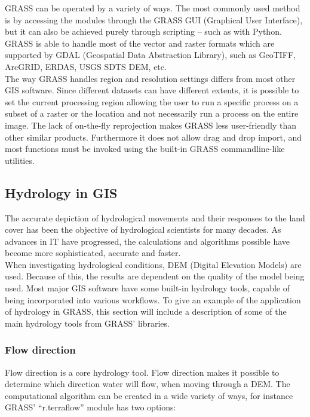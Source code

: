 GRASS can be operated by a variety of ways. The most commonly used method is by accessing the modules through the GRASS GUI (Graphical User Interface), but it can also be achieved purely through scripting – such as with Python. GRASS is able to handle most of the vector and raster formats which are supported by GDAL (Geospatial Data Abstraction Library), such as GeoTIFF, ArcGRID, ERDAS, USGS SDTS DEM, etc. \\

The way GRASS handles region and resolution settings differs from most other GIS software. Since different datasets can have different extents, it is possible to set the current processing region allowing the user to run a specific process on a subset of a raster or the location and not necessarily run a process on the entire image. 
The lack of on-the-fly reprojection makes GRASS less user-friendly than other similar products. Furthermore it does not allow drag and drop import, and most functions must be invoked using the built-in GRASS commandline-like utilities.

\subsection{Hydrology in GIS}

The accurate depiction of hydrological movements and their responses to the land cover has been the objective of hydrological scientists for many decades. As advances in IT have progressed, the calculations and algorithms possible have become more sophisticated, accurate and faster. \\

When investigating hydrological conditions, DEM (Digital Elevation Models) are used. Because of this, the results are dependent on the quality of the model being used. Most major GIS software have some built-in hydrology tools, capable of being incorporated into various workflows. To give an example of the application of hydrology in GRASS, this section will include a description of some of the main hydrology tools from GRASS' libraries.

\subsubsection{Flow direction}
Flow direction is a core hydrology tool. Flow direction makes it possible to determine which direction water will flow, when moving through a DEM. The computational algorithm can be created in a wide variety of ways, for instance GRASS' “r.terraflow” module has two options: 

